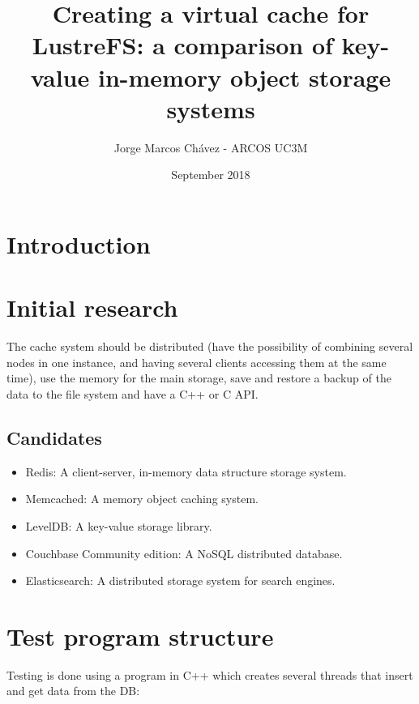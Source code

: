\documentclass[11pt]{article}
\title{Creating a virtual cache for LustreFS: a comparison of key-value in-memory object storage systems}
\author{Jorge Marcos Chávez - ARCOS UC3M}
\date{September 2018}
\begin{document}
\maketitle
\thispagestyle{empty}

\newpage
\tableofcontents

\newpage
\section{Introduction}


\section{Initial research}
The cache system should be distributed (have the possibility of combining several nodes in one instance, and having several clients accessing them at the same time), use the memory for the main storage, save and restore a backup of the data to the file system and have a C++ or C API.

\subsection{Candidates}
\begin{itemize}
    \item Redis: A client-server, in-memory data structure storage system.
    \item Memcached: A memory object caching system.
    \item LevelDB: A key-value storage library.
    \item Couchbase Community edition: A NoSQL distributed database.
    \item Elasticsearch: A distributed storage system for search engines.
\end{itemize}

\section{Test program structure}

Testing is done using a program in C++ which creates several threads that insert and get data from the DB:
\end{document}
